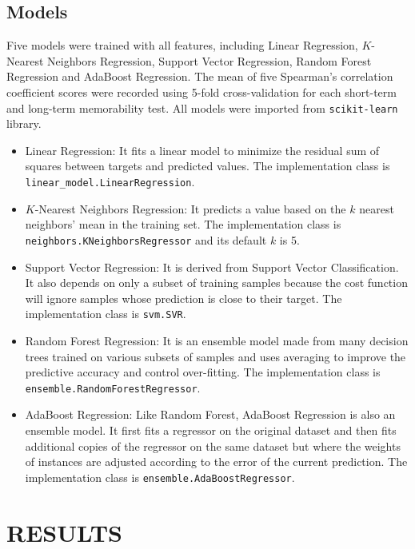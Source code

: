 \documentclass[conference, compsoc]{IEEEtran}
\begin{document}
{\subsection{Models}
Five models were trained with all features,
including Linear Regression, $K$-Nearest Neighbors Regression, Support Vector Regression, Random Forest Regression and AdaBoost Regression.
The mean of five Spearman's correlation coefficient scores were recorded using 5-fold cross-validation for each short-term and long-term memorability test.
All models were imported from \verb|scikit-learn| library.

\begin{itemize}
    \item Linear Regression: It fits a linear model to minimize the residual sum of squares between targets and predicted values.
    The implementation class is \verb|linear_model.LinearRegression|.

    \item $K$-Nearest Neighbors Regression: It predicts a value based on the $k$ nearest neighbors' mean in the training set.
    The implementation class is \verb|neighbors.KNeighborsRegressor| and its default $k$ is 5.

    \item Support Vector Regression: It is derived from Support Vector Classification.
    It also depends on only a subset of training samples because the cost function will ignore samples whose prediction is close to their target.
    The implementation class is \verb|svm.SVR|.

    \item Random Forest Regression:
    It is an ensemble model made from many decision trees trained on various subsets of samples and uses averaging to improve the predictive accuracy and control over-fitting.
    The implementation class is \verb|ensemble.RandomForestRegressor|.

    \item AdaBoost Regression: Like Random Forest, AdaBoost Regression is also an ensemble model.
    It first fits a regressor on the original dataset and then fits additional copies of the regressor on the same dataset
    but where the weights of instances are adjusted according to the error of the current prediction.
    The implementation class is \verb|ensemble.AdaBoostRegressor|.
\end{itemize}


\section{RESULTS}

}
\end{document}
